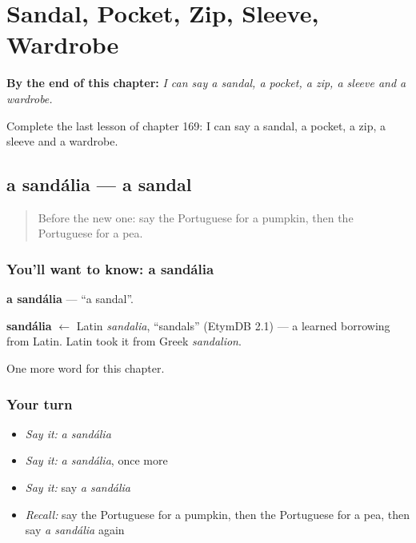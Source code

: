 
\chapter{Sandal, Pocket, Zip, Sleeve, Wardrobe}
\label{ch:pt-sandal-pocket-zip-sleeve-wardrobe}

\begin{chapteropening}
\textbf{By the end of this chapter:} \emph{I can say a sandal, a pocket, a zip, a sleeve and a wardrobe.}

Complete the last lesson of chapter 169: I can say a sandal, a pocket, a zip, a sleeve and a wardrobe.
\end{chapteropening}

\section[a sandália]{a sandália — a sandal}

\label{lesson:PT-C169-sandalia}



\begin{quote}
Before the new one: say the Portuguese for a pumpkin, then the Portuguese for a pea.
\end{quote}

\subsection*{You'll want to know: a sandália}
\textbf{a sandália} — \textquotedblleft{}a sandal\textquotedblright{}.

\begin{cousinweb}
\textbf{sandália} $\leftarrow$ Latin \emph{sandalia}, \textquotedblleft{}sandals\textquotedblright{} (EtymDB 2.1) — a learned borrowing from Latin. Latin took it from Greek \emph{sandalion}.
\end{cousinweb}

\begin{grammarlens}[title={What you've built}]
One more word for this chapter.
\end{grammarlens}

\subsection*{Your turn}
\begin{itemize}
\raggedright
  \item \emph{Say it:} \emph{a sandália}
  \item \emph{Say it:} \emph{a sandália}, once more
  \item \emph{Say it:} say \emph{a sandália}
  \item \emph{Recall:} say the Portuguese for a pumpkin, then the Portuguese for a pea, then say \emph{a sandália} again
\end{itemize}

